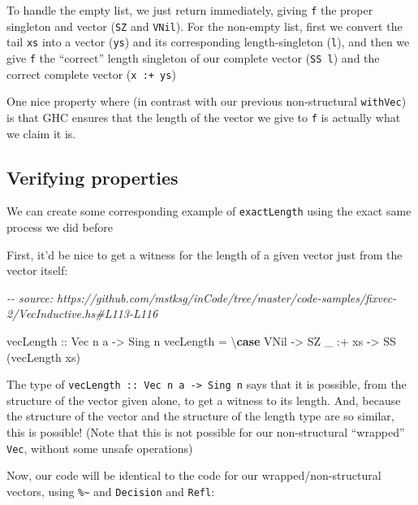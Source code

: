 \documentclass[]{article}
\newenvironment{Shaded}{}{}
\newcommand{\CommentTok}[1]{\textcolor[rgb]{0.38,0.63,0.69}{\textit{#1}}}
\newcommand{\DataTypeTok}[1]{\textcolor[rgb]{0.56,0.13,0.00}{#1}}
\newcommand{\KeywordTok}[1]{\textcolor[rgb]{0.00,0.44,0.13}{\textbf{#1}}}
\newcommand{\NormalTok}[1]{#1}
\newcommand{\OperatorTok}[1]{\textcolor[rgb]{0.40,0.40,0.40}{#1}}
\newcommand{\OtherTok}[1]{\textcolor[rgb]{0.00,0.44,0.13}{#1}}
\begin{document}
To handle the empty list, we just return immediately, giving \texttt{f} the
proper singleton and vector (\texttt{SZ} and \texttt{VNil}). For the non-empty
list, first we convert the tail \texttt{xs} into a vector (\texttt{ys}) and its
corresponding length-singleton (\texttt{l}), and then we give \texttt{f} the
``correct'' length singleton of our complete vector (\texttt{SS\ l}) and the
correct complete vector (\texttt{x\ :+\ ys})

One nice property where (in contrast with our previous non-structural
\texttt{withVec}) is that GHC ensures that the length of the vector we give to
\texttt{f} is actually what we claim it is.

\hypertarget{verifying-properties-1}{%
\subsection{Verifying properties}\label{verifying-properties-1}}

We can create some corresponding example of \texttt{exactLength} using the exact
same process we did before

First, it'd be nice to get a witness for the length of a given vector just from
the vector itself:

\begin{Shaded}
\begin{Highlighting}[]
\CommentTok{{-}{-} source: https://github.com/mstksg/inCode/tree/master/code{-}samples/fixvec{-}2/VecInductive.hs\#L113{-}L116}

\OtherTok{vecLength ::} \DataTypeTok{Vec}\NormalTok{ n a }\OtherTok{{-}>} \DataTypeTok{Sing}\NormalTok{ n}
\NormalTok{vecLength }\OtherTok{=}\NormalTok{ \textbackslash{}}\KeywordTok{case}
    \DataTypeTok{VNil}    \OtherTok{{-}>} \DataTypeTok{SZ}
\NormalTok{    \_ }\OperatorTok{:+}\NormalTok{ xs }\OtherTok{{-}>} \DataTypeTok{SS}\NormalTok{ (vecLength xs)}
\end{Highlighting}
\end{Shaded}

The type of \texttt{vecLength\ ::\ Vec\ n\ a\ -\textgreater{}\ Sing\ n} says
that it is possible, from the structure of the vector given alone, to get a
witness to its length. And, because the structure of the vector and the
structure of the length type are so similar, this is possible! (Note that this
is not possible for our non-structural ``wrapped'' \texttt{Vec}, without some
unsafe operations)

Now, our code will be identical to the code for our wrapped/non-structural
vectors, using \texttt{\%\textasciitilde{}} and \texttt{Decision} and
\texttt{Refl}:
\end{document}

